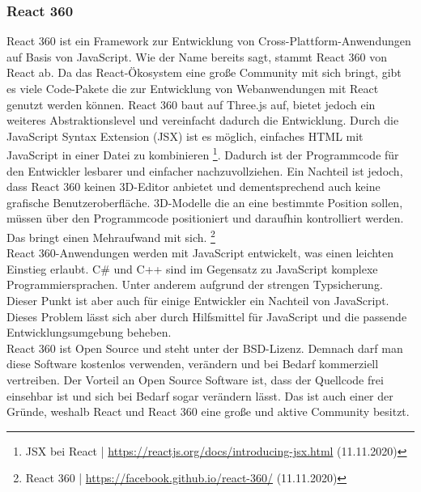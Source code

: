 \documentclass[a4paper,12pt,oneside]{article}
\begin{document}
      \subsubsection{React 360}
        React 360 ist ein Framework zur Entwicklung von Cross-Plattform-Anwendungen auf
        Basis von JavaScript. Wie der Name bereits sagt, stammt React 360 von React ab.
        Da das React-Ökosystem eine große Community mit sich bringt, gibt es viele
        Code-Pakete die zur Entwicklung von Webanwendungen mit React genutzt werden können.
        React 360 baut auf Three.js auf, bietet jedoch ein weiteres Abstraktionslevel und
        vereinfacht dadurch die Entwicklung. Durch die JavaScript Syntax Extension (JSX)
        ist es möglich, einfaches HTML mit JavaScript in einer Datei zu kombinieren 
        \footnote{JSX bei React | \url{https://reactjs.org/docs/introducing-jsx.html} (11.11.2020)}.
        Dadurch ist der Programmcode für den Entwickler lesbarer und einfacher nachzuvollziehen.
        Ein Nachteil ist jedoch, dass React 360 keinen 3D-Editor anbietet und dementsprechend
        auch keine grafische Benutzeroberfläche. 3D-Modelle die
        an eine bestimmte Position sollen, müssen über den Programmcode positioniert und
        daraufhin kontrolliert werden. Das bringt einen Mehraufwand mit sich.
        \footnote{React 360 | \url{https://facebook.github.io/react-360/} (11.11.2020)} \\
        React 360-Anwendungen werden mit JavaScript entwickelt, was einen leichten Einstieg
        erlaubt. C\# und C++ sind im Gegensatz zu JavaScript komplexe
        Programmiersprachen. Unter anderem aufgrund der strengen Typsicherung. Dieser
        Punkt ist aber auch für einige Entwickler ein Nachteil von JavaScript. Dieses
        Problem lässt sich aber durch Hilfsmittel für JavaScript und die passende 
        Entwicklungsumgebung beheben. \\
        React 360 ist Open Source und steht unter der BSD-Lizenz. Demnach darf man diese
        Software kostenlos verwenden, verändern und bei Bedarf kommerziell vertreiben. Der
        Vorteil an Open Source Software ist, dass der Quellcode frei einsehbar ist und 
        sich bei Bedarf sogar verändern lässt. Das ist auch einer der Gründe, weshalb
        React und React 360 eine große und aktive Community besitzt. \\
\end{document}

